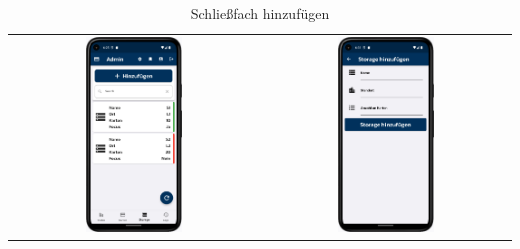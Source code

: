 \vspace{1cm}
\begin{table}[htbp]
  \centering
  \begin{tabular}{cc}
    \includegraphics[width=0.4\textwidth]{FLUTTER/images/ZB/storage_page.png} &
    \includegraphics[width=0.4\textwidth]{FLUTTER/images/ZB/storage_add_page.png} \\
  \end{tabular}
  \label{tab:example}
  \captionsetup{type=figure}
  \caption{Schließfach hinzufügen}
\end{table}

